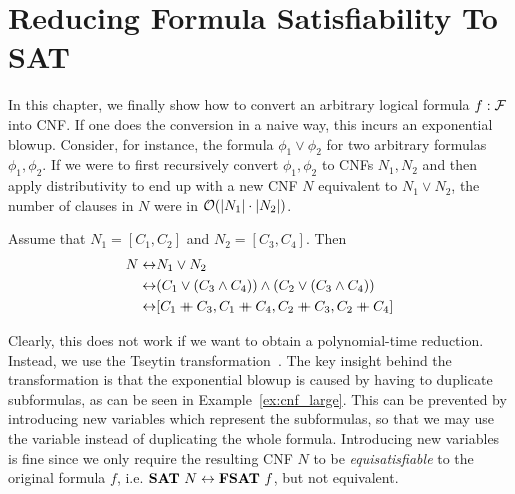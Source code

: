 
\chapter{Reducing Formula Satisfiability To SAT}\label{chap:fsat_sat}
In this chapter, we finally show how to convert an arbitrary logical formula $f : \mathcal{F}$ into CNF. 
If one does the conversion in a naive way, this incurs an exponential blowup. Consider, for instance, the formula $\phi_1 \lor \phi_2$ for two arbitrary formulas $\phi_1, \phi_2$. If we were to first recursively convert $\phi_1, \phi_2$ to CNFs $N_1, N_2$ and then apply distributivity to end up with a new CNF $N$ equivalent to $N_1 \lor N_2$, the number of clauses in $N$ were in $\mathcal{O}{(|N_1| \cdot |N_2|)}$. 
\begin{example}\label{ex:cnf_large}
  Assume that $N_1 = [C_1, C_2]$ and $N_2 = [C_3, C_4]$. Then
  \begin{align*}
    N \leftrightarrow & N_1 \lor N_2 \\
    \leftrightarrow & (C_1 \lor (C_3 \land C_4)) \land (C_2 \lor (C_3 \land C_4)) \\
    \leftrightarrow & [C_1 \concat C_3, C_1 \concat C_4, C_2 \concat C_3, C_2 \concat C_4]
  \end{align*}
\end{example}

Clearly, this does not work if we want to obtain a polynomial-time reduction. Instead, we use the Tseytin transformation~\cite{Tseitin1983}. The key insight behind the transformation is that the exponential blowup is caused by having to duplicate subformulas, as can be seen in Example~\ref{ex:cnf_large}. This can be prevented by introducing new variables which represent the subformulas, so that we may use the variable instead of duplicating the whole formula.
Introducing new variables is fine since we only require the resulting CNF $N$ to be \emph{equisatisfiable} to the original formula $f$, i.e. $\textbf{SAT}{}~N \leftrightarrow \textbf{FSAT}{}~f$, but not equivalent.  

